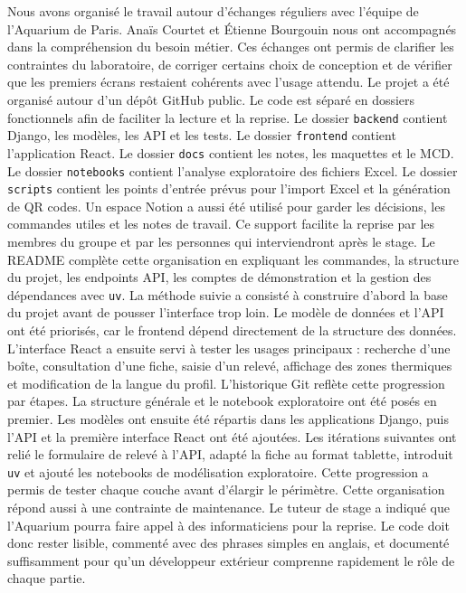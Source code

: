 \documentclass{article}
\begin{document}
Nous avons organisé le travail autour d’échanges réguliers avec l’équipe de l’Aquarium de Paris. Anaïs Courtet et Étienne Bourgouin nous ont accompagnés dans la compréhension du besoin métier. Ces échanges ont permis de clarifier les contraintes du laboratoire, de corriger certains choix de conception et de vérifier que les premiers écrans restaient cohérents avec l’usage attendu.
Le projet a été organisé autour d’un dépôt GitHub public. Le code est séparé en dossiers fonctionnels afin de faciliter la lecture et la reprise. Le dossier \texttt{backend} contient Django, les modèles, les API et les tests. Le dossier \texttt{frontend} contient l’application React. Le dossier \texttt{docs} contient les notes, les maquettes et le MCD. Le dossier \texttt{notebooks} contient l’analyse exploratoire des fichiers Excel. Le dossier \texttt{scripts} contient les points d’entrée prévus pour l’import Excel et la génération de QR codes.
Un espace Notion a aussi été utilisé pour garder les décisions, les commandes utiles et les notes de travail. Ce support facilite la reprise par les membres du groupe et par les personnes qui interviendront après le stage. Le README complète cette organisation en expliquant les commandes, la structure du projet, les endpoints API, les comptes de démonstration et la gestion des dépendances avec \texttt{uv}.
La méthode suivie a consisté à construire d’abord la base du projet avant de pousser l’interface trop loin. Le modèle de données et l’API ont été priorisés, car le frontend dépend directement de la structure des données. L’interface React a ensuite servi à tester les usages principaux : recherche d’une boîte, consultation d’une fiche, saisie d’un relevé, affichage des zones thermiques et modification de la langue du profil.
L’historique Git reflète cette progression par étapes. La structure générale et le notebook exploratoire ont été posés en premier. Les modèles ont ensuite été répartis dans les applications Django, puis l’API et la première interface React ont été ajoutées. Les itérations suivantes ont relié le formulaire de relevé à l’API, adapté la fiche au format tablette, introduit \texttt{uv} et ajouté les notebooks de modélisation exploratoire. Cette progression a permis de tester chaque couche avant d’élargir le périmètre.
Cette organisation répond aussi à une contrainte de maintenance. Le tuteur de stage a indiqué que l’Aquarium pourra faire appel à des informaticiens pour la reprise. Le code doit donc rester lisible, commenté avec des phrases simples en anglais, et documenté suffisamment pour qu’un développeur extérieur comprenne rapidement le rôle de chaque partie.
\end{document}
